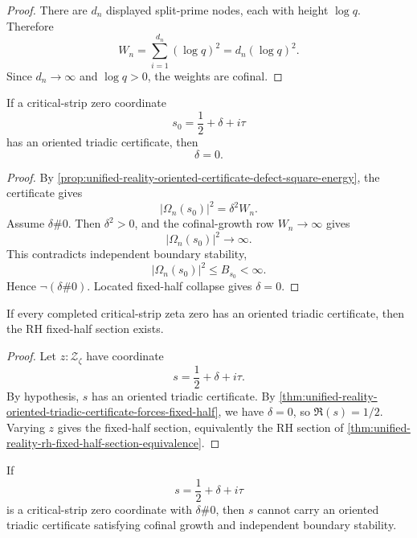 \begin{proof}
There are $d_n$ displayed split-prime nodes, each with height $\log q$.
Therefore
$$
W_n=\sum_{i=1}^{d_n}(\log q)^2=d_n(\log q)^2.
$$
Since $d_n\to\infty$ and $\log q>0$, the weights are cofinal.
\end{proof}

\begin{theorem}
\label{thm:unified-reality-oriented-triadic-certificate-forces-fixed-half}
If a critical-strip zero coordinate
$$
s_0=\frac12+\delta+i\tau
$$
has an oriented triadic certificate, then
$$
\delta=0.
$$
\end{theorem}

\begin{proof}
By
\autoref{prop:unified-reality-oriented-certificate-defect-square-energy},
the certificate gives
$$
|\Omega_n(s_0)|^2=\delta^2W_n.
$$
Assume $\delta\#0$.  Then $\delta^2>0$, and the cofinal-growth row
$W_n\to\infty$ gives
$$
|\Omega_n(s_0)|^2\to\infty.
$$
This contradicts independent boundary stability,
$$
|\Omega_n(s_0)|^2\le B_{s_0}<\infty.
$$
Hence $\neg(\delta\#0)$.  Located fixed-half collapse gives
$\delta=0$.
\end{proof}

\begin{corollary}
\label{cor:unified-reality-oriented-certificate-existence-conditionally-sufficient}
If every completed critical-strip zeta zero has an oriented triadic
certificate, then the RH fixed-half section exists.
\end{corollary}

\begin{proof}
Let $z:\mathcal Z_{\zeta}$ have coordinate
$$
s=\frac12+\delta+i\tau.
$$
By hypothesis, $s$ has an oriented triadic certificate.  By
\autoref{thm:unified-reality-oriented-triadic-certificate-forces-fixed-half},
we have $\delta=0$, so $\Re(s)=1/2$.  Varying $z$ gives the fixed-half
section, equivalently the RH section of
\autoref{thm:unified-reality-rh-fixed-half-section-equivalence}.
\end{proof}

\begin{corollary}
\label{cor:unified-reality-off-half-zeros-not-closed-triadic-generated}
If
$$
s=\frac12+\delta+i\tau
$$
is a critical-strip zero coordinate with $\delta\#0$, then $s$ cannot
carry an oriented triadic certificate satisfying cofinal growth and
independent boundary stability.
\end{corollary}

